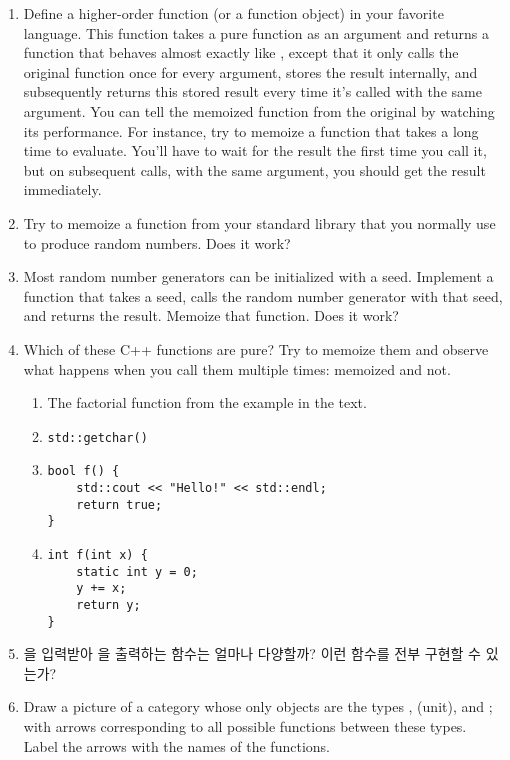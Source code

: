 \begin{enumerate}
\tightlist
\item
  Define a higher-order function (or a function object) 
  in your favorite language. This function takes a pure function
   as an argument and returns a function that behaves almost
  exactly like , except that it only calls the original
  function once for every argument, stores the result internally, and
  subsequently returns this stored result every time it's called with
  the same argument. You can tell the memoized function from the
  original by watching its performance. For instance, try to memoize a
  function that takes a long time to evaluate. You'll have to wait for
  the result the first time you call it, but on subsequent calls, with
  the same argument, you should get the result immediately.
\item
  Try to memoize a function from your standard library that you normally
  use to produce random numbers. Does it work?
\item
  Most random number generators can be initialized with a seed.
  Implement a function that takes a seed, calls the random number
  generator with that seed, and returns the result. Memoize that
  function. Does it work?
\item
  Which of these C++ functions are pure? Try to memoize them and observe
  what happens when you call them multiple times: memoized and not.

  \begin{enumerate}
  \tightlist
  \item
    The factorial function from the example in the text.
  \item
\begin{verbatim}
std::getchar()
\end{verbatim}
  \item
\begin{verbatim}
bool f() { 
    std::cout << "Hello!" << std::endl;
    return true;
}
\end{verbatim}
  \item
\begin{verbatim}
int f(int x) {
    static int y = 0;
    y += x;
    return y;
}
\end{verbatim}
  \end{enumerate}
\item
  을 입력받아 을 출력하는 함수는 얼마나 다양할까? 이런 함수를 전부 구현할 수 있는가?
\item
  Draw a picture of a category whose only objects are the types
  , \code{()} (unit), and ; with arrows
  corresponding to all possible functions between these types. Label the
  arrows with the names of the functions.
\end{enumerate}